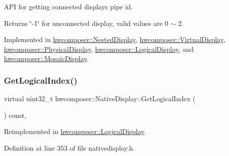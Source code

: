 A\+PI for getting connected display\textquotesingle{}s pipe id. \begin{DoxyReturn}{Returns}
\char`\"{}-\/1\char`\"{} for unconnected display, valid values are 0 $\sim$ 2. 
\end{DoxyReturn}


Implemented in \mbox{\hyperlink{classhwcomposer_1_1NestedDisplay_a71d26edcadd23a93362ca5643dc1f6cf}{hwcomposer\+::\+Nested\+Display}}, \mbox{\hyperlink{classhwcomposer_1_1VirtualDisplay_a7c627b12e08f7f95f85aad9d833cbc32}{hwcomposer\+::\+Virtual\+Display}}, \mbox{\hyperlink{classhwcomposer_1_1PhysicalDisplay_a8bcd7d925e60afbea75bf3aa18b7aa75}{hwcomposer\+::\+Physical\+Display}}, \mbox{\hyperlink{classhwcomposer_1_1LogicalDisplay_acd2630578257e1156d5e00b304df2db8}{hwcomposer\+::\+Logical\+Display}}, and \mbox{\hyperlink{classhwcomposer_1_1MosaicDisplay_aab767066611a255bc84d50c4b53b3d5d}{hwcomposer\+::\+Mosaic\+Display}}.

\mbox{\label{classhwcomposer_1_1NativeDisplay_a991eb1bf6b9dcdb8dd08c171bc8b8b08}} 
\subsubsection{\texorpdfstring{Get\+Logical\+Index()}{GetLogicalIndex()}}
{\footnotesize\ttfamily virtual uint32\+\_\+t hwcomposer\+::\+Native\+Display\+::\+Get\+Logical\+Index (\begin{DoxyParamCaption}{ }\end{DoxyParamCaption}) const\hspace{0.3cm}{\ttfamily [inline]}, {\ttfamily [virtual]}}



Reimplemented in \mbox{\hyperlink{classhwcomposer_1_1LogicalDisplay_a5d45569f5a91a82ff525bee68f9497a7}{hwcomposer\+::\+Logical\+Display}}.



Definition at line 353 of file nativedisplay.\+h.


\begin{DoxyCode}{0}
\end{DoxyCode}
\mbox{\label{classhwcomposer_1_1NativeDisplay_a3f15664f1f298f6109c6504bdd46019a}} 
